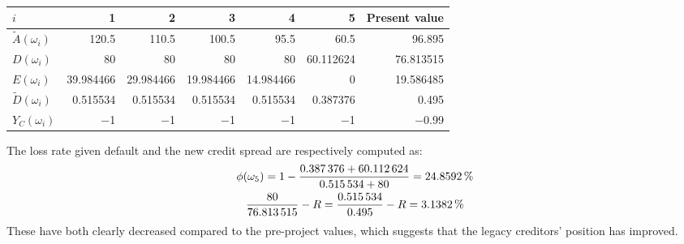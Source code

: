 \documentclass[main.tex]{subfiles}
\begin{document}
        \begin{table}[H]
            \centering
            \begin{tabular}{l|rrrrr||r}
                $i$ & 1 & 2 & 3 & 4 & 5 & Present value \\
                \hline
                \rule{0pt}{1.1em}
                $\tilde{A}(\omega_{i})$ & 
                    \num{120.5} & \num{110.5} & \num{100.5} & \num{95.5} & \num{60.5} & \num{96.895} \\
                $D(\omega_{i})$ & 
                    \num{80} & \num{80} & \num{80} & \num{80} & \num{60.112624} & \num{76.813515} \\
                $E(\omega_{i})$ & 
                    \num{39.984466} & \num{29.984466} & \num{19.984466} & \num{14.984466} & \num{0} & \num{19.586485}\\
                $\tilde{D}(\omega_{i})$ & 
                    \num{0.515534} & \num{0.515534} & \num{0.515534} & \num{0.515534} & \num{0.387376} & \num{0.495}\\
                $Y_C(\omega_{i})$ & 
                    \num{-1} & \num{-1} & \num{-1} & \num{-1} & \num{-1} & \num{-0.99} \\
            \end{tabular}
            \caption{}
            \label{tbl:example-collateralised-derivative}
        \end{table}
        The loss rate given default and the new credit spread are respectively computed as:
            \begin{gather*}
                \phi(\omega_{5})
                = 
                    1 
                    - 
                    \frac{
                        \num{0.387376}+\num{60.112624}
                    }{
                        \num{0.515534}+\num{80}
                    }
                = 
                    \pct{0.248592}
                \\
                    \frac{
                        \num{80}    
                    }{
                        \num{76.813515} 
                    } 
                    - 
                    \grossrfrate 
                = 
                    \frac{
                        \num{0.515534}
                    }{        
                        \num{0.495}
                    } 
                    -
                    \grossrfrate 
                = 
                    \pct{0.031382} 
            \end{gather*}
        These have both clearly decreased compared to the pre-project values, 
        which suggests that the legacy creditors' position has improved.
\end{document}
